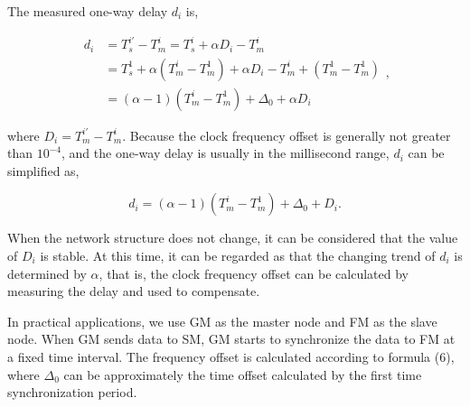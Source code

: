 \documentclass[conference]{IEEEtran}
\begin{document}


The measured one-way delay $d_i$ is,

\begin{equation}
\begin{aligned}
d_i &= T_s^{i'} - T_m^i = T_s^i + \alpha {D_i} - T_m^i\\
 	&= T_s^1 + \alpha (T_m^i - T_m^1) + \alpha {D_i} - T_m^i + (T_m^1 - T_m^1)\\
 	&= (\alpha  - 1)(T_m^i - T_m^1) + \Delta_0  + \alpha {D_i} 
\end{aligned},
\label{eq5}
\end{equation}


\noindent where $D_i=T_m^{i'}-T_m^i$. Because the clock frequency offset is generally not greater than $10^{-4}$, and the one-way delay is usually in the millisecond range, $d_i$ can be simplified as,

\begin{equation}
d_i = (\alpha - 1)(T_m^i - T_m^1) + \Delta_0 + D_i. \label {eq6}
\end{equation}

When the network structure does not change, it can be considered that the value of $D_i$ is stable. At this time, it can be regarded as that the changing trend of $d_i$ is determined by $\alpha$, that is, the clock frequency offset can be calculated by measuring the delay and used to compensate.

In practical applications, we use GM as the master node and FM as the slave node. When GM sends data to SM, GM starts to synchronize the data to FM at a fixed time interval. The frequency offset is calculated according to formula (6), where $\Delta_0$ can be approximately the time offset calculated by the first time synchronization period.

\end{document}

